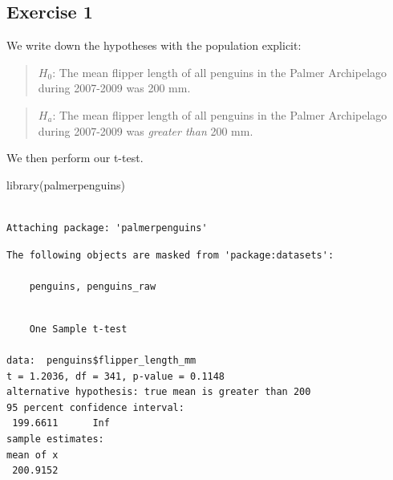 \documentclass[
  letterpaper,
  DIV=11,
  numbers=noendperiod]{scrreprt}
\newenvironment{Shaded}{\begin{snugshade}}{\end{snugshade}}
\newcommand{\AttributeTok}[1]{\textcolor[rgb]{0.40,0.45,0.13}{#1}}
\newcommand{\DecValTok}[1]{\textcolor[rgb]{0.68,0.00,0.00}{#1}}
\newcommand{\FunctionTok}[1]{\textcolor[rgb]{0.28,0.35,0.67}{#1}}
\newcommand{\NormalTok}[1]{\textcolor[rgb]{0.00,0.23,0.31}{#1}}
\newcommand{\SpecialCharTok}[1]{\textcolor[rgb]{0.37,0.37,0.37}{#1}}
\newcommand{\StringTok}[1]{\textcolor[rgb]{0.13,0.47,0.30}{#1}}
\begin{document}
\subsection{Exercise 1}\label{exercise-1-21}

We write down the hypotheses with the population explicit:

\begin{quote}
\textbf{\(H_0\)}: The mean flipper length of all penguins in the Palmer
Archipelago during 2007-2009 was 200 mm.
\end{quote}

\begin{quote}
\textbf{\(H_a\)}: The mean flipper length of all penguins in the Palmer
Archipelago during 2007-2009 was \emph{greater than} 200 mm.
\end{quote}

We then perform our t-test.

\begin{Shaded}
\begin{Highlighting}[]
\FunctionTok{library}\NormalTok{(palmerpenguins)}
\end{Highlighting}
\end{Shaded}

\begin{verbatim}

Attaching package: 'palmerpenguins'
\end{verbatim}

\begin{verbatim}
The following objects are masked from 'package:datasets':

    penguins, penguins_raw
\end{verbatim}

\begin{Shaded}
\end{Shaded}

\begin{verbatim}

    One Sample t-test

data:  penguins$flipper_length_mm
t = 1.2036, df = 341, p-value = 0.1148
alternative hypothesis: true mean is greater than 200
95 percent confidence interval:
 199.6611      Inf
sample estimates:
mean of x 
 200.9152 
\end{verbatim}
\end{document}
